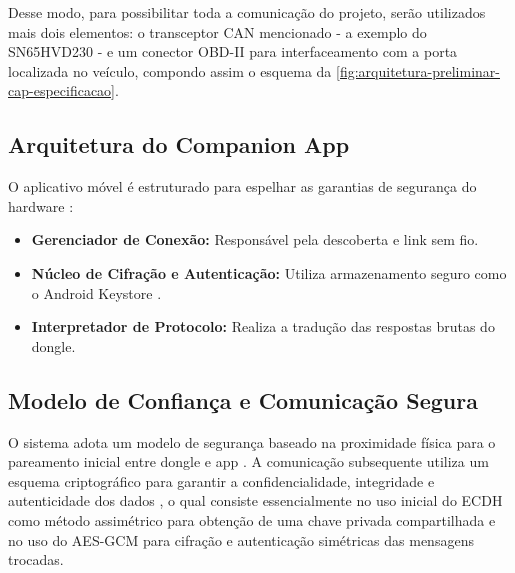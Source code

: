 Desse modo, para possibilitar toda a comunicação do projeto, serão utilizados mais dois elementos: o transceptor CAN mencionado - a exemplo do SN65HVD230 \cite{SN65HVD23x-datasheet} - e um conector OBD-II para interfaceamento com a porta localizada no veículo, compondo assim o esquema da \autoref{fig:arquitetura-preliminar-cap-especificacao}.

\subsection{Arquitetura do Companion App}

O aplicativo móvel é estruturado para espelhar as garantias de segurança do hardware \cite{companionapps2024security}:

\begin{itemize}
    \item \textbf{Gerenciador de Conexão:} Responsável pela descoberta e link sem fio.
    \item \textbf{Núcleo de Cifração e Autenticação:} Utiliza armazenamento seguro como o Android Keystore \cite{companionapps2024security}.
    \item \textbf{Interpretador de Protocolo:} Realiza a tradução das respostas brutas do dongle.
\end{itemize}

\subsection{Modelo de Confiança e Comunicação Segura}

O sistema adota um modelo de segurança baseado na proximidade física para o pareamento inicial entre dongle e app \cite{wen2020plugnpwned}. A comunicação subsequente utiliza um esquema criptográfico para garantir a confidencialidade, integridade e autenticidade dos dados \cite{companionapps2024security}, o qual consiste essencialmente no uso inicial do ECDH como método assimétrico para obtenção de uma chave privada compartilhada e no uso do AES-GCM para cifração e autenticação simétricas das mensagens trocadas.
